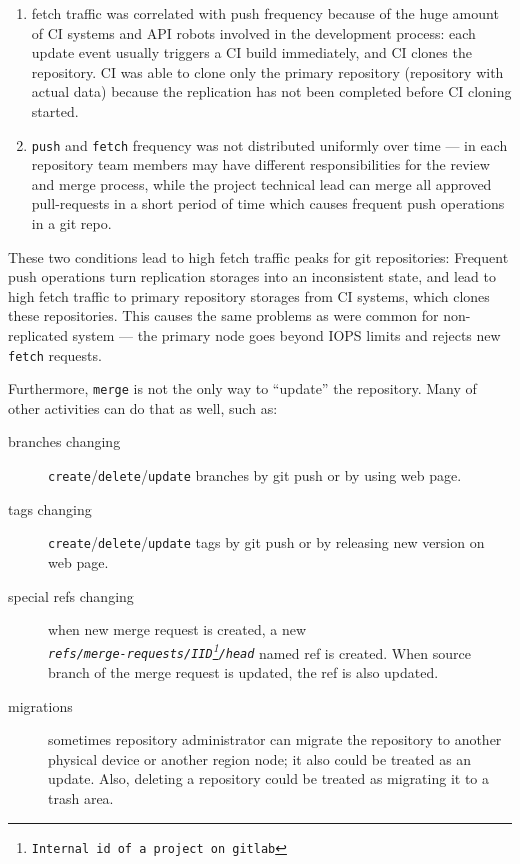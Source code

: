 \documentclass[acmlarge, screen, nonacm, 11pt]{acmart}
\newcommand{\code}[1]{\texttt{#1}}
\begin{document}
\begin{enumerate}
  \item fetch traffic was correlated with push frequency because of the huge amount of
  CI systems and API robots involved in the development process: each update event usually triggers
  a CI build immediately, and CI clones the repository. CI was able to clone only the
  primary repository (repository with actual data) because the replication has not been completed
  before CI cloning started.
  \item \code{push} and \code{fetch} frequency was not distributed uniformly over time --- in each
  repository team members may have different responsibilities for the review and merge process, while
  the project technical lead can merge all approved pull-requests in a short period of time
  which causes frequent push operations in a git repo.
\end{enumerate}

These two conditions lead to high fetch traffic peaks for git repositories:
Frequent push operations turn replication storages into an inconsistent state,
and lead to high fetch traffic to primary repository storages from CI systems, which clones these repositories.
This causes the same problems as were common for non-replicated system --- the primary node goes beyond IOPS limits and
rejects new \code{fetch} requests.

Furthermore, \code{merge} is not the only way to ``update'' the repository. Many of other activities can do that as well,
such as:

\begin{description}
  \item[branches changing] \verb|create|/\verb|delete|/\verb|update| branches by git push or by using web page.
  \item[tags changing] \verb|create|/\verb|delete|/\verb|update| tags by git push or by releasing new version on web page.
  \item[special refs changing] when new merge request is created, a new\\
    \emph{\code{refs/merge-requests/IID\footnote{Internal id of a project on gitlab}/head}} named ref
    is created. When source branch of the merge request is updated, the ref is also updated.
  \item[migrations] sometimes repository administrator can migrate the repository to
    another physical device or another region node; it also could be treated as an update.
    Also, deleting a repository could be treated as migrating it to a trash area.
\end{description}
\end{document}
